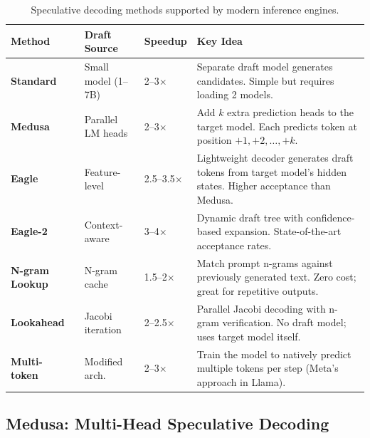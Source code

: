\begin{table}[ht!]
\centering
\caption{Speculative decoding methods supported by modern inference engines.}
\begin{tabular}{@{}lllp{6cm}@{}}
\toprule
\textbf{Method} & \textbf{Draft Source} & \textbf{Speedup} & \textbf{Key Idea} \\
\midrule
\textbf{Standard}~\cite{leviathan2023fast} & Small model (1--7B) & 2--3$\times$ & Separate draft model generates candidates. Simple but requires loading 2 models. \\
\textbf{Medusa}~\cite{cai2024medusa} & Parallel LM heads & 2--3$\times$ & Add $k$ extra prediction heads to the target model. Each predicts token at position $+1, +2, \ldots, +k$. \\
\textbf{Eagle}~\cite{li2024eagle} & Feature-level & 2.5--3.5$\times$ & Lightweight decoder generates draft tokens from target model's hidden states. Higher acceptance than Medusa. \\
\textbf{Eagle-2}~\cite{li2024eagle} & Context-aware & 3--4$\times$ & Dynamic draft tree with confidence-based expansion. State-of-the-art acceptance rates. \\
\textbf{N-gram Lookup} & N-gram cache & 1.5--2$\times$ & Match prompt n-grams against previously generated text. Zero cost; great for repetitive outputs. \\
\textbf{Lookahead}~\cite{fu2024lookahead} & Jacobi iteration & 2--2.5$\times$ & Parallel Jacobi decoding with n-gram verification. No draft model; uses target model itself. \\
\textbf{Multi-token}~\cite{gloeckle2024multi} & Modified arch. & 2--3$\times$ & Train the model to natively predict multiple tokens per step (Meta's approach in Llama). \\
\bottomrule
\end{tabular}
\end{table}

\subsection{Medusa: Multi-Head Speculative Decoding}
\label{medusa-multi-head-speculative-decoding}

